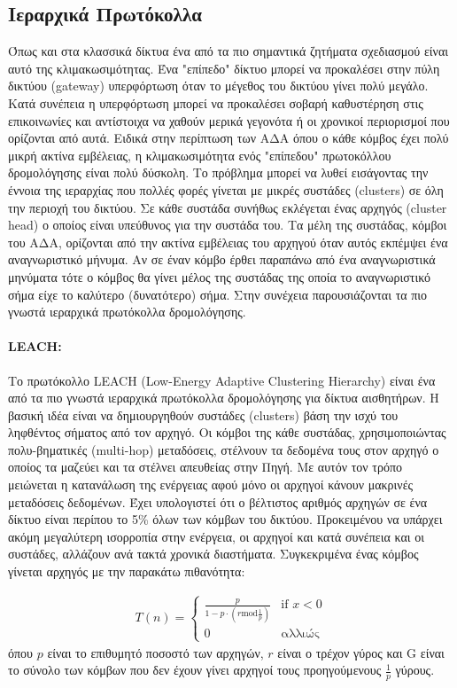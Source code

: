 \subsection{Ιεραρχικά Πρωτόκολλα}
Όπως και στα κλασσικά δίκτυα ένα από τα πιο σημαντικά ζητήματα σχεδιασμού είναι αυτό της κλιμακωσιμότητας. Ένα "επίπεδο" δίκτυο μπορεί να προκαλέσει στην πύλη
δικτύου (gateway) υπερφόρτωση όταν το μέγεθος του δικτύου γίνει πολύ μεγάλο. Κατά συνέπεια η υπερφόρτωση μπορεί να προκαλέσει σοβαρή καθυστέρηση στις επικοινωνίες
και αντίστοιχα να χαθούν μερικά γεγονότα ή οι χρονικοί περιορισμοί που ορίζονται από αυτά. Ειδικά στην περίπτωση των ΑΔΑ όπου ο κάθε κόμβος έχει πολύ μικρή ακτίνα
εμβέλειας, η κλιμακωσιμότητα ενός "επίπεδου" πρωτοκόλλου δρομολόγησης είναι πολύ δύσκολη. Το πρόβλημα μπορεί να λυθεί εισάγοντας την έννοια της ιεραρχίας που πολλές
φορές γίνεται με μικρές συστάδες (clusters) σε όλη την περιοχή του δικτύου. Σε κάθε συστάδα συνήθως εκλέγεται ένας αρχηγός (cluster head) ο οποίος είναι υπεύθυνος για
την συστάδα του. Τα μέλη της συστάδας, κόμβοι του ΑΔΑ, ορίζονται από την ακτίνα εμβέλειας του αρχηγού όταν αυτός εκπέμψει ένα αναγνωριστικό μήνυμα. Αν σε έναν κόμβο
έρθει παραπάνω από ένα αναγνωριστικά μηνύματα τότε ο κόμβος θα γίνει μέλος της συστάδας της οποία το αναγνωριστικό σήμα είχε το καλύτερο (δυνατότερο) σήμα. Στην
συνέχεια παρουσιάζονται τα πιο γνωστά ιεραρχικά πρωτόκολλα δρομολόγησης.

\paragraph{LEACH:} Το πρωτόκολλο LEACH (Low-Energy Adaptive Clustering Hierarchy) \cite{leach_protocol} είναι ένα από τα πιο γνωστά ιεραρχικά πρωτόκολλα δρομολόγησης
για δίκτυα αισθητήρων. Η βασική ιδέα είναι να δημιουργηθούν συστάδες (clusters) βάση την ισχύ του ληφθέντος σήματος από τον αρχηγό. Οι κόμβοι της κάθε συστάδας,
χρησιμοποιώντας πολυ-βηματικές (multi-hop) μεταδόσεις, στέλνουν τα δεδομένα τους στον αρχηγό ο οποίος τα μαζεύει και τα στέλνει απευθείας στην Πηγή. Με αυτόν τον
τρόπο μειώνεται η κατανάλωση της ενέργειας αφού μόνο οι αρχηγοί κάνουν μακρινές μεταδόσεις δεδομένων. Έχει υπολογιστεί ότι ο βέλτιστος αριθμός αρχηγών σε ένα δίκτυο
είναι περίπου το 5\% όλων των κόμβων του δικτύου. Προκειμένου να υπάρχει ακόμη μεγαλύτερη ισορροπία στην ενέργεια, οι αρχηγοί και κατά συνέπεια και οι συστάδες,
αλλάζουν ανά τακτά χρονικά διαστήματα. Συγκεκριμένα ένας κόμβος γίνεται αρχηγός με την παρακάτω πιθανότητα:

\begin{align*}
T(n) = \left\{
\begin{array}{cc}
 \frac{p}{1-p\cdot(r \text{mod}\frac{1}{p})} & \text{if } x<0 \\
  0 & \text{αλλιώς}
\end{array} \right.
\end{align*}
όπου $p$ είναι το επιθυμητό ποσοστό των αρχηγών, $r$ είναι ο τρέχον γύρος και G είναι το σύνολο των κόμβων που δεν έχουν γίνει αρχηγοί τους προηγούμενους
$\frac{1}{p}$
γύρους.

